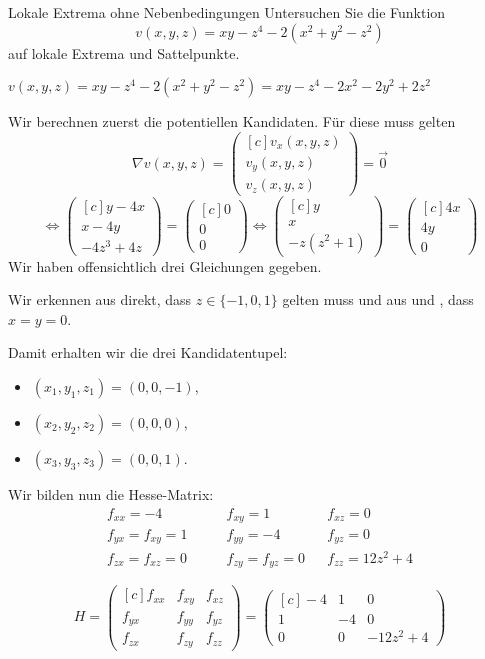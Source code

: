 \documentclass[german]{../spicker}
\newcommand{\vektor}[1]{\begin{pmatrix*}[c] #1 \end{pmatrix*}}
\begin{document}
\begin{example}{Lokale Extrema ohne Nebenbedingungen}
    Untersuchen Sie die Funktion
    $$
        v(x, y, z) = xy - z^4 -2(x^2 + y^2 -z^2)
    $$ auf lokale Extrema und Sattelpunkte.

    \exampleseparator

    $v(x, y, z) = xy - z^4 -2(x^2 + y^2 -z^2) = xy - z^4 -2x^2 -2y^2 + 2z^2$

    Wir berechnen zuerst die potentiellen Kandidaten.
    Für diese muss gelten
    $$
        \nabla v(x, y, z) = \vektor{v_x(x, y, z)      \\ v_y(x, y, z)\\ v_z(x, y, z)} = \vec{0}
    $$
    $$
        \iff \vektor{ y -4x \\ x -4y \\ -4z^3 +4z} = \vektor{0 \\ 0 \\ 0} \iff \vektor{y \\ x \\ -z(z^2 +1)} = \vektor{4x \\ 4y \\ 0}
    $$
    Wir haben offensichtlich drei Gleichungen gegeben.

    Wir erkennen aus  direkt, dass $z \in \{-1, 0, 1\}$ gelten muss und aus  und , dass $x = y = 0$.

    Damit erhalten wir die drei Kandidatentupel:
    \begin{itemize}
        \item $(x_1, y_1, z_1) = (0, 0, -1)$,
        \item $(x_2, y_2, z_2) = (0, 0, 0)$,
        \item $(x_3, y_3, z_3) = (0, 0, 1)$.
    \end{itemize}

    Wir bilden nun die Hesse-Matrix:
    $$
        \begin{aligned}
            f_{xx} = -4 \qquad         & f_{xy} = 1          &  & f_{xz} = 0         \\
            f_{yx} = f_{xy} = 1 \qquad & f_{yy} = -4         &  & f_{yz} = 0         \\
            f_{zx} = f_{xz} = 0 \qquad & f_{zy} = f_{yz} = 0 &  & f_{zz} = 12z^2 + 4
        \end{aligned}
    $$

    $$
        H = \vektor{f_{xx} & f_{xy} & f_{xz} \\ f_{yx} & f_{yy} & f_{yz} \\ f_{zx} & f_{zy} & f_{zz}} = \vektor{-4 & 1 & 0 \\ 1 & -4 & 0 \\ 0 & 0 & -12z^2 + 4}
    $$


\end{example}
\end{document}
